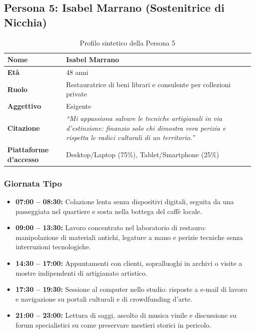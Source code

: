 \documentclass[11pt,a4paper]{article}
\begin{document}
\subsection{Persona 5: Isabel Marrano (Sostenitrice di Nicchia)}

\begin{table}[h!]
\centering
\small
\begin{tabular}{|p{3.5cm}|p{11.5cm}|}
\hline
\textbf{Nome} & Isabel Marrano \\ \hline
\textbf{Età} & 48 anni \\ \hline
\textbf{Ruolo} & Restauratrice di beni librari e consulente per collezioni private \\ \hline
\textbf{Aggettivo} & Esigente \\ \hline
\textbf{Citazione} & \textit{``Mi appassiona salvare le tecniche artigianali in via d'estinzione: finanzio solo chi dimostra vera perizia e rispetta le radici culturali di un territorio.''} \\ \hline
\textbf{Piattaforme d'accesso} & Desktop/Laptop (75\%), Tablet/Smartphone (25\%) \\ \hline
\end{tabular}
\caption{Profilo sintetico della Persona 5}
\label{tab:persona5}
\end{table}

\subsubsection{Giornata Tipo}
\begin{itemize}
    \item \textbf{07:00 -- 08:30:} Colazione lenta senza dispositivi digitali, seguita da una passeggiata nel quartiere e sosta nella bottega del caffè locale.
    \item \textbf{09:00 -- 13:30:} Lavoro concentrato nel laboratorio di restauro: manipolazione di materiali antichi, legature a mano e perizie tecniche senza interruzioni tecnologiche.
    \item \textbf{14:30 -- 17:00:} Appuntamenti con clienti, sopralluoghi in archivi o visite a mostre indipendenti di artigianato artistico.
    \item \textbf{17:30 -- 19:30:} Sessione al computer nello studio: risposte a e-mail di lavoro e navigazione su portali culturali e di crowdfunding d'arte.
    \item \textbf{21:00 -- 23:00:} Lettura di saggi, ascolto di musica vinile e discussione su forum specialistici su come preservare mestieri storici in pericolo.
\end{itemize}
\end{document}
